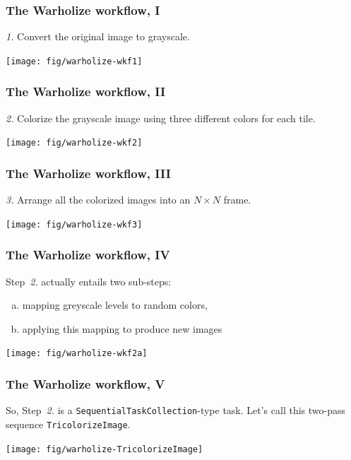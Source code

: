 \documentclass[english,serif,mathserif,xcolor=pdftex,dvipsnames,table]{beamer}
\begin{document}
\begin{frame}
  \frametitle{The Warholize workflow, I}

  {\color{gray}\itshape 1.}
  Convert the original image to grayscale.

  \+
  \texttt{[image: fig/warholize-wkf1]}
\end{frame}


\begin{frame}
  \frametitle{The Warholize workflow, II}

  {\color{gray}\itshape 2.}
  Colorize the grayscale image using three different colors for each tile.

  \+
  \texttt{[image: fig/warholize-wkf2]}
\end{frame}


\begin{frame}
  \frametitle{The Warholize workflow, III}

  {\color{gray}\itshape 3.}
  Arrange all the colorized images into an $N\times N$ frame.

  \+
  \texttt{[image: fig/warholize-wkf3]}
\end{frame}


\begin{frame}
  \frametitle{The Warholize workflow, IV}

  Step~\textit{2.} actually entails two sub-steps:
  \begin{enumerate}[a)]
  \item mapping greyscale levels to random colors,
  \item applying this mapping to produce new images
  \end{enumerate}

  \+
  \texttt{[image: fig/warholize-wkf2a]}
\end{frame}


\begin{frame}
  \frametitle{The Warholize workflow, V}

  So, Step~\textit{2.} is a \texttt{SequentialTaskCollection}-type task.
  Let's call this two-pass sequence \texttt{TricolorizeImage}.

  \+
  \texttt{[image: fig/warholize-TricolorizeImage]}
\end{frame}
\end{document}
